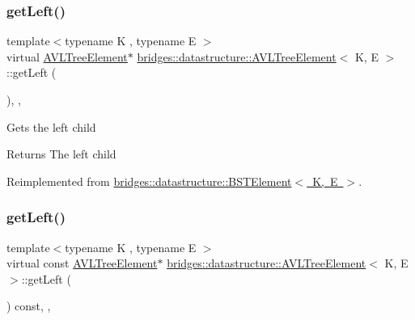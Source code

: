 \subsubsection{\texorpdfstring{get\+Left()}{getLeft()}\hspace{0.1cm}{\footnotesize\ttfamily [1/2]}}
{\footnotesize\ttfamily template$<$typename K , typename E $>$ \\
virtual \mbox{\hyperlink{classbridges_1_1datastructure_1_1_a_v_l_tree_element}{A\+V\+L\+Tree\+Element}}$\ast$ \mbox{\hyperlink{classbridges_1_1datastructure_1_1_a_v_l_tree_element}{bridges\+::datastructure\+::\+A\+V\+L\+Tree\+Element}}$<$ K, E $>$\+::get\+Left (\begin{DoxyParamCaption}{ }\end{DoxyParamCaption})\hspace{0.3cm}{\ttfamily [inline]}, {\ttfamily [override]}, {\ttfamily [virtual]}}

Gets the left child \begin{DoxyReturn}{Returns}
The left child 
\end{DoxyReturn}


Reimplemented from \mbox{\hyperlink{classbridges_1_1datastructure_1_1_b_s_t_element_af863c624691c11db26ae3b6d723d1f5c}{bridges\+::datastructure\+::\+B\+S\+T\+Element$<$ K, E $>$}}.

\mbox{\label{classbridges_1_1datastructure_1_1_a_v_l_tree_element_a4a639e0c623435aadf5c51ed132cb25d}} 
\subsubsection{\texorpdfstring{get\+Left()}{getLeft()}\hspace{0.1cm}{\footnotesize\ttfamily [2/2]}}
{\footnotesize\ttfamily template$<$typename K , typename E $>$ \\
virtual const \mbox{\hyperlink{classbridges_1_1datastructure_1_1_a_v_l_tree_element}{A\+V\+L\+Tree\+Element}}$\ast$ \mbox{\hyperlink{classbridges_1_1datastructure_1_1_a_v_l_tree_element}{bridges\+::datastructure\+::\+A\+V\+L\+Tree\+Element}}$<$ K, E $>$\+::get\+Left (\begin{DoxyParamCaption}{ }\end{DoxyParamCaption}) const\hspace{0.3cm}{\ttfamily [inline]}, {\ttfamily [override]}, {\ttfamily [virtual]}}

